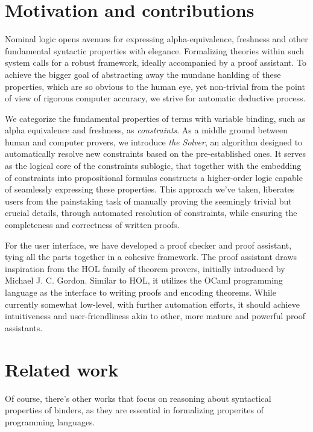 \documentclass[english, mgr]{iithesis}
\begin{document}
\section{Motivation and contributions}
Nominal logic opens avenues for expressing alpha-equivalence, freshness and
other fundamental syntactic properties with elegance.
Formalizing theories within such system calls for
a robust framework, ideally accompanied by a proof assistant.
To achieve the bigger goal of abstracting away the mundane hanlding of these
properties, which are so obvious to the human eye,
yet non-trivial from the point of view of rigorous computer accuracy,
we strive for automatic deductive process.

We categorize the fundamental properties of terms with variable binding,
such as alpha equivalence and freshness, as \textit{constraints}.
As a middle ground between human and computer provers,
we introduce \textit{the Solver}, an algorithm designed to automatically
resolve new constraints based on the pre-established ones.
It serves as the logical core of the constraints sublogic,
that together with the embedding of constraints into propositional formulas
constructs a higher-order logic capable of seamlessly expressing these properties.
This approach we've taken, liberates users from the painstaking task of manually proving the seemingly trivial but crucial details, through automated resolution of constraints,
while ensuring the completeness and correctness of written proofs.

For the user interface, we have developed a proof checker and proof assistant,
tying all the parts together in a cohesive framework.
The proof assistant draws inspiration from the HOL family of theorem provers,
initially introduced by Michael J. C. Gordon\cite{HOL}.
Similar to HOL, it utilizes the OCaml programming language as the
interface to writing proofs and encoding theorems.
While currently somewhat low-level, with further automation efforts,
it should achieve intuitiveness and user-friendliness akin to other,
more mature and powerful proof assistants.

\section{Related work}
Of course, there's other works that focus on reasoning about
syntactical properties of binders, as they are essential
in formalizing properites of programming languages.
\end{document}
